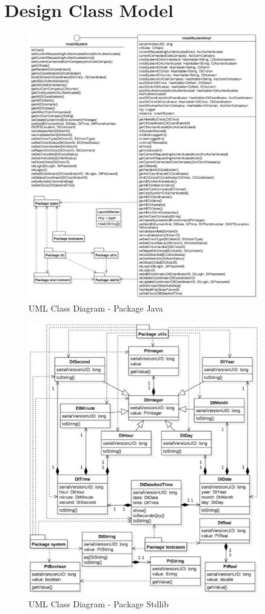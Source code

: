 \section{Design Class Model}
	

\begin{figure}[h!]
	\centering
	\includegraphics[width=0.9\textwidth]{./images/dcm_java.eps}
	\caption{UML Class Diagram - Package Java}
\end{figure}


\begin{figure}[h!]
	\centering
	\includegraphics[width=0.9\textwidth]{./images/dcm_stdlib.eps}
	\caption{UML Class Diagram - Package Stdlib}
\end{figure}

